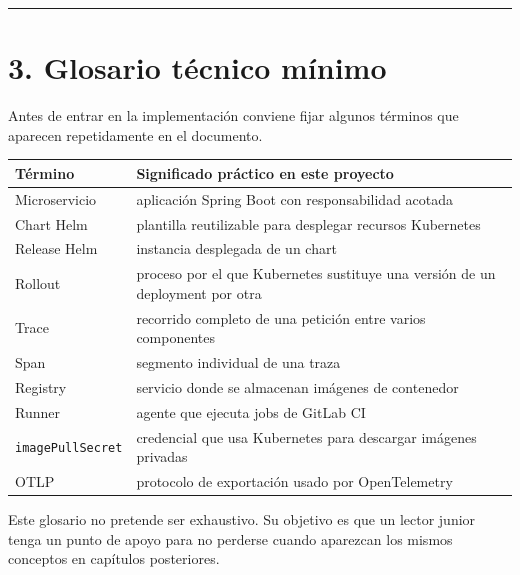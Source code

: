 \documentclass[
a4paper,
12pt]{report}
\begin{document}
\begin{center}\rule{0.5\linewidth}{0.5pt}\end{center}

\chapter{3. Glosario técnico
mínimo}\label{glosario-tuxe9cnico-muxednimo}

Antes de entrar en la implementación conviene fijar algunos términos que
aparecen repetidamente en el documento.

{\def\LTcaptype{table} %
\begin{longtable}[]{@{}
  >{\raggedright\arraybackslash}p{}
  >{\raggedright\arraybackslash}p{}@{}}
\toprule\noalign{}
\begin{minipage}[b]{\linewidth}\raggedright
Término
\end{minipage} & \begin{minipage}[b]{\linewidth}\raggedright
Significado práctico en este proyecto
\end{minipage} \\
\midrule\noalign{}
\endhead
\bottomrule\noalign{}
\endlastfoot
Microservicio & aplicación Spring Boot con responsabilidad acotada \\
Chart Helm & plantilla reutilizable para desplegar recursos
Kubernetes \\
Release Helm & instancia desplegada de un chart \\
Rollout & proceso por el que Kubernetes sustituye una versión de un
deployment por otra \\
Trace & recorrido completo de una petición entre varios componentes \\
Span & segmento individual de una traza \\
Registry & servicio donde se almacenan imágenes de contenedor \\
Runner & agente que ejecuta jobs de GitLab CI \\
\texttt{imagePullSecret} & credencial que usa Kubernetes para descargar
imágenes privadas \\
OTLP & protocolo de exportación usado por OpenTelemetry \\
\end{longtable}
}

Este glosario no pretende ser exhaustivo. Su objetivo es que un lector
junior tenga un punto de apoyo para no perderse cuando aparezcan los
mismos conceptos en capítulos posteriores.
\end{document}
